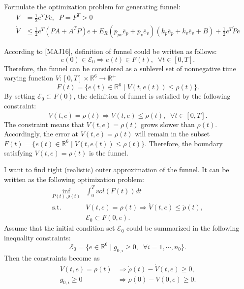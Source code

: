 \documentclass{article}
\begin{document}
Formulate the optimization problem for generating funnel:
\begin{align}
V &= \frac{1}{2}e^TPe,\;\;P = P^T >0 \nonumber \\
\dot{V} &\leq \frac{1}{2}e^T(PA + A^TP)e+ E_R(p_{pv}\bar{e}_p+p_v\bar{e}_v)(k_p\bar{e}_p+k_v\bar{e}_v+B)+\frac{1}{2}e^T\dot{P}e \nonumber
\end{align}

According to [MAJ16], definition of funnel could be written as follows:
\begin{equation}
e(0) \in \mathcal{E}_0 \Longrightarrow e(t) \in F(t),\;\; \forall t \in [0,T]. \nonumber
\end{equation}
Therefore, the funnel can be considered as a sublevel set of nonnegative time varying function $V:[0,T]\times \mathbb{R}^6 \rightarrow \mathbb{R}^+$
\begin{equation}
F(t) = \{e(t) \in \mathbb{R}^6\; |\; V(t,e(t)) \leq \rho(t)\}. \nonumber
\end{equation}
By setting $\mathcal{E}_0 \subset F(0)$, the definition of funnel is satisfied by the following constraint:
\begin{equation}
V(t,e) = \rho(t) \Longrightarrow \dot{V}(t,e) \leq \dot{\rho}(t),\;\;\forall t \in [0,T]. \nonumber
\end{equation}
The constraint means that $V(t,e) = \rho(t)$ grows slower than $\rho(t)$. Accordingly, the error at $V(t,e) = \rho(t)$ will remain in the subset $F(t) = \{e(t) \in \mathbb{R}^6\;|\;V(t,e(t)) \leq \rho(t)\}$. 
Therefore, the boundary satisfying $V(t,e) = \rho(t)$ is the funnel.

I want to find tight (realistic) outer approximation of the funnel.
It can be written as the following optimization problem:
\begin{equation}
\begin{array}{ll}
\inf_{P(t),\rho(t)} &\displaystyle \int_0^T vol(F(t))dt \\ 
\text{s.t.} & V(t,e) = \rho(t) \Longrightarrow \dot{V}(t,e) \leq \dot{\rho}(t), \\
            & \mathcal{E}_0 \subset F(0,e). 
\end{array} \nonumber
\end{equation}
Assume that the initial condition set $\mathcal{E}_0$ could be summarized in the following inequality constraints:
\begin{equation}
\mathcal{E}_0 = \{e\in\mathbb{R}^6 \;|\; g_{0,i} \geq 0, \;\;\forall i = 1,\cdots,n_0\}.
\nonumber
\end{equation}
Then the constraints become as
\begin{align}
V(t,e) = \rho(t) &\Longrightarrow  \dot{\rho}(t) - \dot{V}(t,e) \geq 0, \nonumber\\
g_{0,i} \geq 0 &\Longrightarrow \rho(0) - V(0,e) \geq 0.  \nonumber 
\end{align}
\end{document}
